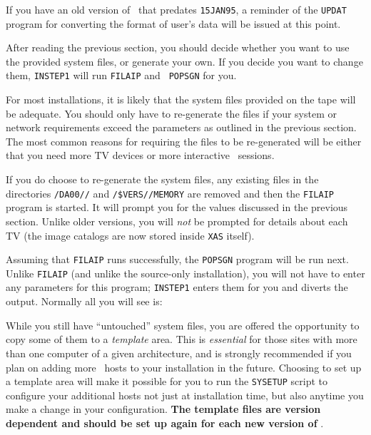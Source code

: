 If you have an old version of \AIPS\ that predates {\tt 15JAN95}, a
reminder of the {\tt UPDAT} program for converting the format of user's
data will be issued at this point.

\medskip{}

After reading the previous section, you should decide whether you want
to use the provided system files, or generate your own.  If you decide
you want to change them, {\tt INSTEP1} will run {\tt FILAIP} and {\tt
POPSGN} for you.

For most installations, it is likely that the system files provided on
the tape will be adequate.  You should only have to re-generate the
files if your system or network requirements exceed the parameters as
outlined in the previous section.  The most common reasons for requiring
the files to be re-generated will be either that you need more TV
devices or more interactive \AIPS\ sessions.

If you do choose to re-generate the system files, any existing files in
the directories {\tt\AROOT/DA00/\HOST/} and
{\tt\AROOT/\$VERS/\ARCH/MEMORY}
are removed and then the {\tt FILAIP} program is started.  It will
prompt you for the values discussed in the previous section.  Unlike
older versions, you will {\it not\/} be prompted for details about each
TV (the image catalogs are now stored inside {\tt XAS} itself).

Assuming that {\tt FILAIP} runs successfully, the {\tt POPSGN} program
will be run next.  Unlike {\tt FILAIP} (and unlike the source-only
installation), you will not have to enter any parameters for this
program; {\tt INSTEP1} enters them for you and diverts the output.
Normally all you will see is:\medskip

\medskip

\medskip{}

While you still have ``untouched'' system files, you are offered the
opportunity to copy some of them to a {\it template\/} area.  This is
{\it essential\/} for those sites with more than one computer of a given
architecture, and is strongly recommended if you plan on adding more
\AIPS\ hosts to your installation in the future.  Choosing to set up a
template area will make it possible for you to run the {\tt SYSETUP}
script to configure your additional hosts not just at installation time,
but also anytime you make a change in your configuration.  {\bf The
template files are version dependent and should be set up again for each
new version of} \AIPS.

